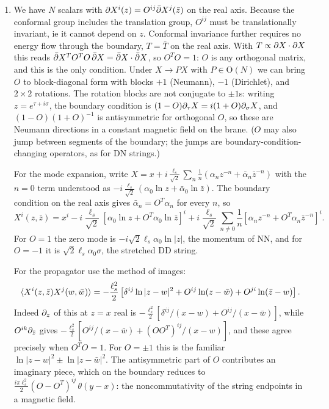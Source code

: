 \documentclass[11pt]{article}
\begin{document}
\begin{enumerate}
	\item 
	We have $N$ scalars with $\partial X^i (z) = O^{ij} \bar {\partial} X^j(\bar z)$ on the real axis. Because the conformal group includes the translation group, $O^{ij}$ must be translationally invariant, ie it cannot depend on $z$. Conformal invariance further requires no energy flow through the boundary, $T = \bar T$ on the real axis. With $T \propto \partial X \cdot \partial X$ this reads $\bar {\partial} X^T O^T O\, \bar {\partial} X = \bar {\partial} X \cdot \bar {\partial} X$, so $O^T O = 1$: $O$ is any orthogonal matrix, and this is the only condition. Under $X \to P X$ with $P \in \mathrm{O}(N)$ we can bring $O$ to block-diagonal form with blocks $+1$ (Neumann), $-1$ (Dirichlet), and $2 \times 2$ rotations. The rotation blocks are not conjugate to $\pm 1$s: writing $z = e^{\tau + i \sigma}$, the boundary condition is $(1 - O) \partial_\tau X = i (1 + O) \partial_\sigma X$, and $(1-O)(1+O)^{-1}$ is antisymmetric for orthogonal $O$, so these are Neumann directions in a constant magnetic field on the brane. ($O$ may also jump between segments of the boundary; the jumps are boundary-condition-changing operators, as for DN strings.)
	
	For the mode expansion, write $X = x + i \frac{\ell_s}{\sqrt 2} \sum_n \frac1n (\alpha_n z^{-n} + \bar \alpha_n \bar z^{-n})$ with the $n = 0$ term understood as $-i \frac{\ell_s}{\sqrt 2} (\alpha_0 \ln z + \bar \alpha_0 \ln \bar z)$. The boundary condition on the real axis gives $\bar \alpha_n = O^T \alpha_n$ for every $n$, so
	\[
		X^i(z, \bar z) = x^i - i \frac{\ell_s}{\sqrt 2} \left[\alpha_0 \ln z + O^T \alpha_0 \ln \bar z\right]^i + i \frac{\ell_s}{\sqrt 2} \sum_{n \neq 0} \frac1n \left[\alpha_n z^{-n} + O^T \alpha_n \bar z^{-n}\right]^i.
	\]
	For $O = 1$ the zero mode is $-i \sqrt 2 \ell_s \alpha_0 \ln|z|$, the momentum of NN, and for $O = -1$ it is $\sqrt 2 \ell_s \alpha_0 \sigma$, the stretched DD string.
	
	For the propagator use the method of images:
	\[
		\braket{X^i(z, \bar z) X^j(w, \bar w)} = -\frac{\ell_s^2}{2} \left[\delta^{ij} \ln|z-w|^2 + O^{ij} \ln(z - \bar w) + O^{ji} \ln(\bar z - w)\right].
	\]
	Indeed $\partial_z$ of this at $z = x$ real is $-\frac{\ell_s^2}{2} [\delta^{ij}/(x-w) + O^{ij}/(x - \bar w)]$, while $O^{ik} \partial_{\bar z}$ gives $-\frac{\ell_s^2}{2} [O^{ij}/(x - \bar w) + (O O^T)^{ij}/(x - w)]$, and these agree precisely when $O^T O = 1$. For $O = \pm 1$ this is the familiar $\ln|z-w|^2 \pm \ln|z - \bar w|^2$. The antisymmetric part of $O$ contributes an imaginary piece, which on the boundary reduces to $\frac{i \pi \ell_s^2}{2} (O - O^T)^{ij}\, \theta(y - x)$: the noncommutativity of the string endpoints in a magnetic field.
	 

\end{enumerate}
\end{document}

